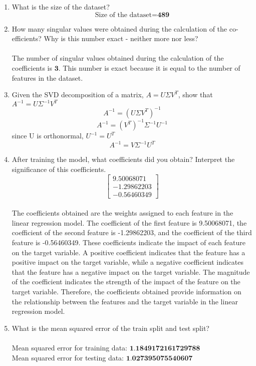 \documentclass[12pt]{extarticle} %
\begin{document}
\begin{enumerate}
    \item What is the size of the dataset?
    \[
    \text{Size of the dataset} = \textbf{489}
    \]
    \item How many singular values were obtained during the calculation of the co-efficients? Why is this number exact - neither more nor less?
    \\\\ The number of singular values obtained during the calculation of the coefficients is \(\textbf{3}\). This number is exact because it is equal to the number of features in the dataset. 
    \item Given the SVD decomposition of a matrix, \(A = U \Sigma V^T\), show that \(A^{-1} = U\Sigma^{-1}V^T\)
    \[
    A^{-1} = (U \Sigma V^T)^{-1}
    \]
    \[
    A^{-1} = (V^T)^{-1} \Sigma^{-1} U^{-1}
    \]
    since U is orthonormal, \(U^{-1} = U^{T}\)
    \[
    A^{-1} = V \Sigma^{-1} U^T
    \]
    
    \item After training the model, what coefficients did you obtain? Interpret the significance of this coefficients.
    \[
        \begin{bmatrix}
            9.50068071 \\
            -1.29862203 \\
            -0.56460349
        \end{bmatrix}
    \] 
    \\ The coefficients obtained are the weights assigned to each feature in the linear regression model. The coefficient of the first feature is 9.50068071, the coefficient of the second feature is -1.29862203, and the coefficient of the third feature is -0.56460349. These coefficients indicate the impact of each feature on the target variable. A positive coefficient indicates that the feature has a positive impact on the target variable, while a negative coefficient indicates that the feature has a negative impact on the target variable. The magnitude of the coefficient indicates the strength of the impact of the feature on the target variable. Therefore, the coefficients obtained provide information on the relationship between the features and the target variable in the linear regression model.
    \item What is the mean squared error of the train split and test split?
    \\\\ Mean squared error for training data:  \(\textbf{1.1849172161729788}\)
    \\ Mean squared error for testing data:  \(\textbf{1.027395075540607}\)


\end{enumerate}
\end{document}
